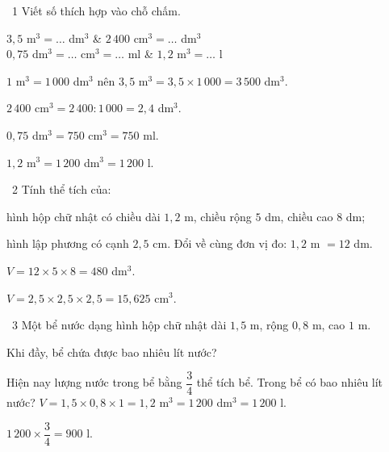 \begin{exbox}{\ExWord\ 1}
Viết số thích hợp vào chỗ chấm.
\begin{cols2}
 $3{,}5$ m$^3=\ldots$ dm$^3$ &  $2\,400$ cm$^3=\ldots$ dm$^3$\\
 $0{,}75$ dm$^3=\ldots$ cm$^3=\ldots$ ml &  $1{,}2$ m$^3=\ldots$ l
\end{cols2}
\guide
{} $1$ m$^3=1\,000$ dm$^3$ nên $3{,}5$ m$^3=3{,}5\times1\,000=3\,500$ dm$^3$.\par
{} $2\,400$ cm$^3=2\,400:1\,000=2{,}4$ dm$^3$.\par
{} $0{,}75$ dm$^3=750$ cm$^3=750$ ml.\par
{} $1{,}2$ m$^3=1\,200$ dm$^3=1\,200$ l.
\end{exbox}
\gap
\begin{exbox}{\ExWord\ 2}
Tính thể tích của:\par
{} hình hộp chữ nhật có chiều dài $1{,}2$ m, chiều rộng $5$ dm, chiều cao $8$ dm;\par
{} hình lập phương có cạnh $2{,}5$ cm.
\guide
{} Đổi về cùng đơn vị đo: $1{,}2$ m $=12$ dm.\par $V=12\times5\times8=480$ dm$^3$.\par
{} $V=2{,}5\times2{,}5\times2{,}5=15{,}625$ cm$^3$.
\end{exbox}
\gap
\begin{exbox}{\ExWord\ 3}
Một bể nước dạng hình hộp chữ nhật dài $1{,}5$ m, rộng $0{,}8$ m, cao $1$ m.\par
{} Khi đầy, bể chứa được bao nhiêu lít nước?\par
{} Hiện nay lượng nước trong bể bằng $\dfrac34$ thể tích bể. Trong bể có bao nhiêu lít nước?
\guide
{} $V=1{,}5\times0{,}8\times1=1{,}2$ m$^3=1\,200$ dm$^3=1\,200$ l.\par
{} $1\,200\times\dfrac34=900$ l.
\end{exbox}
\gap
